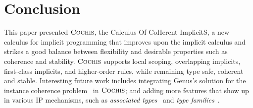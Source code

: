 \section{Conclusion}
\label{sec:conclusion}

This paper presented $\textsc{Cochis}$, the Calculus Of CoHerent ImplicitS, a new
calculus for implicit programming that improves upon the implicit calculus and
strikes a good balance between flexibility and desirable properties
such as coherence and stability.
$\textsc{Cochis}$ supports local scoping, overlapping implicits, first-class
implicits, and higher-order rules, while remaining type safe, coherent and
stable.
Interesting future work includes integrating Genus's solution for the
instance coherence problem~\cite{Zhang15LFO} in $\textsc{Cochis}$; and 
adding more features that show up 
in various IP mechanisms, such as \emph{associated types}~\cite{assoctypes,assoctypes2} and \emph{type
  families}~\cite{typefunc}.

 





%
% 
% 






